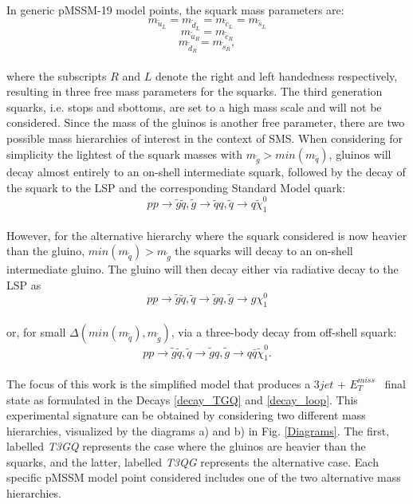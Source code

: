 \documentclass[a4paper,11pt]{article}
\newcommand{\MET}{{ $E_T ^{miss}$}}
\begin{document}
In generic pMSSM-19 model points, the squark mass parameters are: 
\begin{equation*}
m_{\tilde u_L} = m_{\tilde d_L} = m_{\tilde c_L} = m_{\tilde s_L} 
\end{equation*}
\begin{equation*}
m_{\tilde u_R} = m_{\tilde c_R} 
\end{equation*}
\begin{equation*}
m_{\tilde d_R} = m_{\tilde s_R} ,
\end{equation*}
\\
where the subscripts $R$ and $L$ denote the right and left handedness respectively, resulting in three free mass parameters for the squarks. The third generation squarks, i.e. stops and sbottoms, are set to a high mass scale and will not be considered. Since the mass of the gluinos is another free parameter, there are two possible mass hierarchies of interest in the context of SMS. 
When considering for simplicity the lightest of the squark masses with $m_{\tilde g} > min(m_{\tilde q})$, gluinos will decay almost entirely to an on-shell intermediate squark, followed by the decay of the squark to the LSP and the corresponding Standard Model quark:
\begin{equation}\label{decay_TGQ}
p p \rightarrow \tilde g \tilde q , \tilde g \rightarrow \tilde q q , \tilde q \rightarrow q \tilde \chi_1 ^0
\end{equation}
\\
However, for the alternative hierarchy where the squark considered is now heavier than the gluino,  $ min(m_{\tilde q}) > m_{\tilde g}$ the squarks will decay to an on-shell intermediate gluino. The gluino will then decay either via radiative decay to the LSP as 
\begin{equation}\label{decay_loop}
p p \rightarrow \tilde g \tilde q ,\tilde q \rightarrow \tilde g q , \tilde g \rightarrow g \chi_1 ^0
\end{equation} 
\\
or, for small $\Delta (min(m_{\tilde q}), m_{\tilde g})$,  via a three-body decay from off-shell squark:
\begin{equation}
p p \rightarrow \tilde g \tilde q ,\tilde q \rightarrow \tilde g q, \tilde g \rightarrow q \bar q \tilde \chi _1 ^0.
\end{equation}
\\


The focus of this work is the simplified model that produces a $3jet$ + \MET~ final state as formulated in the Decays \ref{decay_TGQ} and \ref{decay_loop}. This experimental signature can be obtained by considering two different mass hierarchies, visualized by the diagrams a) and b) in Fig. \ref{Diagrams}. The first, labelled \textit{T3GQ} represents the case where the gluinos are heavier than the squarks, and the latter, labelled \textit{T3QG} represents the alternative case. Each specific pMSSM model point considered includes one of the two alternative mass hierarchies. 
\end{document}
